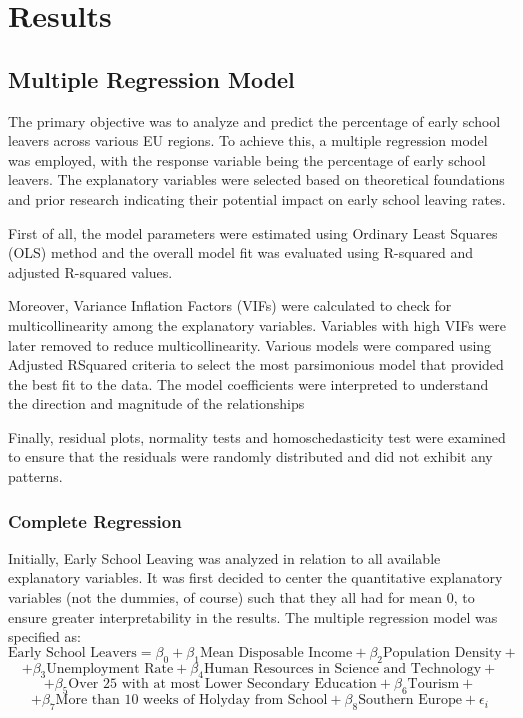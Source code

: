 \documentclass[
  letterpaper,
  DIV=11,
  numbers=noendperiod,
  abstract]{scrartcl}
\begin{document}
\section{Results}\label{results}

\subsection{Multiple Regression Model}\label{multiple-regression-model}

The primary objective was to analyze and predict the percentage of early
school leavers across various EU regions. To achieve this, a multiple
regression model was employed, with the response variable being the
percentage of early school leavers. The explanatory variables were
selected based on theoretical foundations and prior research indicating
their potential impact on early school leaving rates.

First of all, the model parameters were estimated using Ordinary Least
Squares (OLS) method and the overall model fit was evaluated using
R-squared and adjusted R-squared values.

Moreover, Variance Inflation Factors (VIFs) were calculated to check for
multicollinearity among the explanatory variables. Variables with high
VIFs were later removed to reduce multicollinearity. Various models were
compared using Adjusted RSquared criteria to select the most
parsimonious model that provided the best fit to the data. The model
coefficients were interpreted to understand the direction and magnitude
of the relationships

Finally, residual plots, normality tests and homoschedasticity test were
examined to ensure that the residuals were randomly distributed and did
not exhibit any patterns.

\subsubsection{Complete Regression}\label{complete-regression}

Initially, Early School Leaving was analyzed in relation to all
available explanatory variables. It was first decided to center the
quantitative explanatory variables (not the dummies, of course) such
that they all had for mean 0, to ensure greater interpretability in the
results. The multiple regression model was specified as: \[
\text{Early School Leavers} = \beta_0 + \beta_1 \text{Mean Disposable Income} + \beta_2 \text{Population Density} + \]
\[
+ \beta_3 \text{Unemployment Rate} + \beta_4 \text{Human Resources in Science and Technology} + \]
\[
+ \beta_5 \text{Over 25 with at most Lower Secondary Education}+ \beta_6 \text {Tourism} + \]
\[
+ \beta_7 \text {More than 10 weeks of Holyday from School} + \beta_8 \text {Southern Europe} + \epsilon{_i} \]
\end{document}
